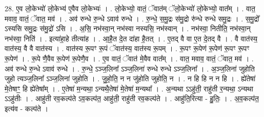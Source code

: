 \documentclass[17pt]{extarticle}
\begin{document}
28. ए॒व लो॒केभ्यो॑ लो॒केभ्य॑ ए॒वैव लो॒केभ्यः॑ । . लो॒केभ्यो॒ वातं॒ ॅवात॑म् ॅलो॒केभ्यो॑ लो॒केभ्यो॒ वात᳚म् । . वात॒ मवाव॒ वातं॒ ॅवात॒ मव॑ । . अव॑ रुन्धे रु॒न्धे ऽवाव॑ रुन्धे । . रु॒न्धे॒ स॒मु॒द्रः स॑मु॒द्रो रु॑न्धे रुन्धे समु॒द्रः । . स॒मु॒द्रो᳚ ऽस्यसि समु॒द्रः स॑मु॒द्रो॑ ऽसि । . अ॒सि॒ नभ॑स्वा॒न् नभ॑स्वा नस्यसि॒ नभ॑स्वान् । . नभ॑स्वा॒ नितीति॒ नभ॑स्वा॒न् नभ॑स्वा॒ निति॑ । . इत्या॑हा॒हे तीत्या॑ह । . आ॒है॒त दे॒त दा॑हा है॒तत् । . ए॒तद् वै वा ए॒त दे॒तद् वै । . वै वात॑स्य॒ वात॑स्य॒ वै वै वात॑स्य । . वात॑स्य रू॒पꣳ रू॒पं ॅवात॑स्य॒ वात॑स्य रू॒पम् । . रू॒पꣳ रू॒पेण॑ रू॒पेण॑ रू॒पꣳ रू॒पꣳ रू॒पेण॑ । . रू॒पे णै॒वैव रू॒पेण॑ रू॒पेणै॒व । . ए॒व वातं॒ ॅवात॑ मे॒वैव वात᳚म् । . वात॒ मवाव॒ वातं॒ ॅवात॒ मव॑ । . अव॑ रुन्धे रु॒न्धे ऽवाव॑ रुन्धे । . रु॒न्धे॒ ऽञ्ज॒लिना᳚ ऽञ्ज॒लिना॑ रुन्धे रुन्धे ऽञ्ज॒लिना᳚ । . अ॒ञ्ज॒लिना॑ जुहोति जुहो त्यञ्ज॒लिना᳚ ऽञ्ज॒लिना॑ जुहोति । . जु॒हो॒ति॒ न न जु॑होति जुहोति॒ न । . न हि हि न न हि । . ह्ये॑तेषा॑ मे॒तेषाꣳ॒॒ हि ह्ये॑तेषा᳚म् । . ए॒तेषा॑ म॒न्यथा॒ ऽन्यथै॒तेषा॑ मे॒तेषा॑ म॒न्यथा᳚ । . अ॒न्यथा ऽऽहु॑ती॒ राहु॑ती र॒न्यथा॒ ऽन्यथा ऽऽहु॑तीः । . आहु॑ती रव॒कल्प॑ते ऽव॒कल्प॑त॒ आहु॑ती॒ राहु॑ती रव॒कल्प॑ते । . आहु॑ति॒रित्या - हु॒तिः॒ । . अ॒व॒कल्प॑त॒ इत्य॑व - कल्प॑ते । \newline
\end{document}
